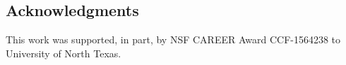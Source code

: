 
\subsection*{Acknowledgments}

This work was supported, in part, by NSF CAREER Award
CCF-1564238 to University of North Texas.

